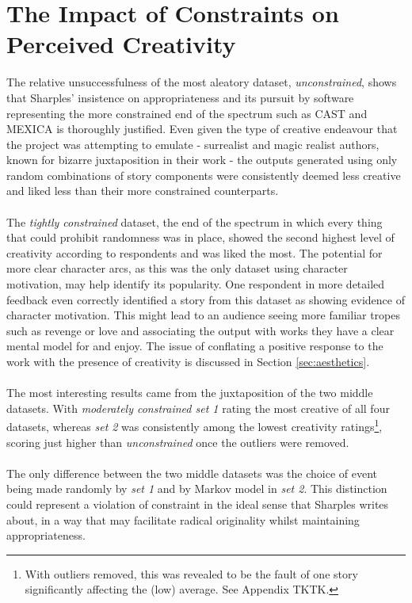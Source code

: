 \documentclass[letterpaper]{article}
\begin{document}
\section{The Impact of Constraints on Perceived Creativity}
The relative unsuccessfulness of the most aleatory dataset, \emph{unconstrained}, shows that Sharples' insistence on appropriateness and its pursuit by software representing the more constrained end of the spectrum such as CAST and MEXICA is thoroughly justified. Even given the type of creative endeavour that the project was attempting to emulate - surrealist and magic realist authors, known for bizarre juxtaposition in their work - the outputs generated using only random combinations of story components were consistently deemed less creative and liked less than their more constrained counterparts.\\ 
\\The \emph{tightly constrained} dataset, the end of the spectrum in which every thing that could prohibit randomness was in place, showed the second highest level of creativity according to respondents and was liked the most. The potential for more clear character arcs, as this was the only dataset using character motivation, may help identify its popularity. One respondent in more detailed feedback even correctly identified a story from this dataset as showing evidence of character motivation. This might lead to an audience seeing more familiar tropes such as revenge or love and associating the output with works they have a clear mental model for and enjoy. The issue of conflating a positive response to the work with the presence of creativity is discussed in Section \ref{sec:aesthetics}.\\
\\The most interesting results came from the juxtaposition of the two middle datasets. With \emph{moderately constrained set 1} rating the most creative of all four datasets, whereas \emph{set 2} was consistently among the lowest creativity ratings\footnote{With outliers removed, this was revealed to be the fault of one story significantly affecting the (low) average. See Appendix TKTK.}, scoring just higher than \emph{unconstrained} once the outliers were removed.\\
\\The only difference between the two middle datasets was the choice of event being made randomly by \emph{set 1} and by Markov model in \emph{set 2}. This distinction could represent a violation of constraint in the ideal sense that Sharples writes about, in a way that may facilitate radical originality whilst maintaining appropriateness.\\
\end{document}
